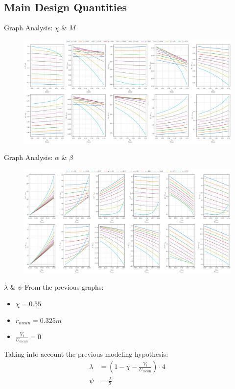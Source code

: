 \subsection{Main Design Quantities}
	\begin{frame}{Graph Analysis: $\chi$ \& $M$}
		\begin{figure}
			\centering
			\includegraphics[width=\textwidth]{figures/reactionStudy0.png}
		\end{figure}
	\end{frame}
	\begin{frame}{Graph Analysis: $\alpha$ \& $\beta$}
		\begin{figure}
			\centering
			\includegraphics[width=\textwidth]{figures/reactionStudy1.png}
		\end{figure}
	\end{frame}
	\begin{frame}{$\lambda$ \& $\psi$}
		From the previous graphs:
			\begin{itemize}
				\item $\chi = 0.55$
				\item $r_{mean} = 0.325 m$
				\item $\frac{V_t}{U_{mean}} = 0$
			\end{itemize}
		Taking into account the previous modeling hypothesis:
		\begin{align}
			\lambda & = (1 - \chi - \frac{V_t}{U_{mean}}) \cdot 4 \\ 
			\psi    & = \frac{\lambda}{2} 
		\end{align}
	\end{frame}
	
